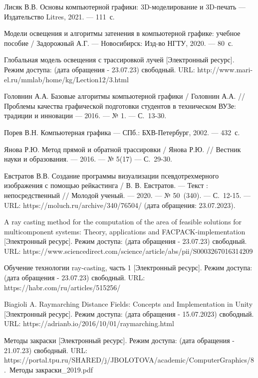 
\renewcommand\bibname{СПИСОК ИСПОЛЬЗОВАННЫХ ИСТОЧНИКОВ} %
{}

\begin{thebibliography}{99}
    Лисяк В.В. Основы компьютерной графики: 3D-моделирование и 3D-печать --- Издательство Litres, 2021. --- 111~с.
    
    Модели освещения и алгоритмы затенения в компьютерной графике: учебное пособие / Задорожный А.Г. --- Новосибирск: Изд-во НГТУ, 2020. --- 80~с.
    
    Глобальная модель освещения с трассировкой лучей [Электронный ресурс]. Режим доступа: (дата обращения - 23.07.23) свободный. URL: http://www.mari-el.ru/mmlab/home/kg/Lection12/3.html
    
    Головнин А.А. Базовые алгоритмы компьютерной графики / Головнин А.А. // Проблемы качества графической подготовки студентов в техническом ВУЗе: традиции и инновации --- 2016. --- № 1. --- С.~13-30.

    Порев В.Н. Компьютерная графика --- СПб.: БХВ-Петербург, 2002. --- 432~с.
    
    Янова Р.Ю. Метод прямой и обратной трассировки / Янова Р.Ю. // Вестник науки и образования. --- 2016. --- № 5(17) --- С.~29-30.
    
    Евстратов В.В. Создание программы визуализации псевдотрехмерного изображения с помощью рейкастинга / В. В. Евстратов. --- Текст : непосредственный // Молодой ученый. --- 2020. --- № 50~(340). --- С.~12-15. --- URL: https://moluch.ru/archive/340/76504/ (дата обращения: 23.07.2023).

    A ray casting method for the computation of the area of feasible solutions for multicomponent systems: Theory, applications and FACPACK-implementation [Электронный ресурс]. Режим доступа: (дата обращения - 23.07.23) свободный. URL: https://www.sciencedirect.com/science/article/abs/pii/S0003267016314209 
    
    Обучение технологии ray-casting, часть 1 [Электронный ресурс]. Режим доступа: (дата обращения - 23.07.23) свободный. URL: https://habr.com/ru/articles/515256/

    Biagioli A. Raymarching Distance Fields: Concepts and Implementation in Unity [Электронный ресурс]. Режим доступа: (дата обращения - 15.07.2023) свободный. URL: https://adrianb.io/2016/10/01/raymarching.html

    Методы закраски [Электронный ресурс]. Режим доступа: (дата обращения - 21.07.23) свободный. URL: https://portal.tpu.ru/SHARED/j/JBOLOTOVA/academic/ComputerGra\-phics/8.~Методы закраски\_2019.pdf
    
\end{thebibliography}

{}

